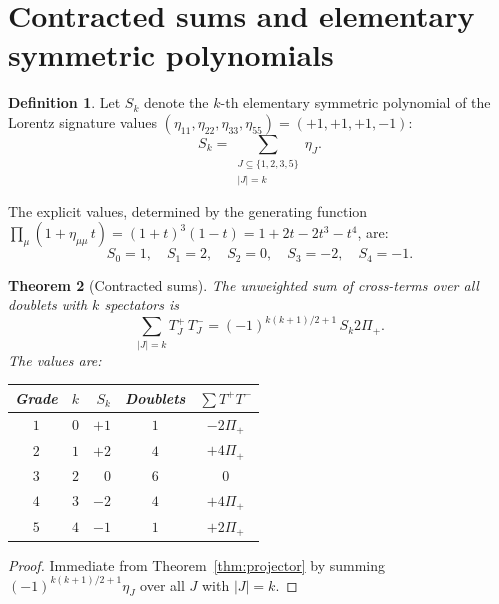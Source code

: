 \documentclass{birkjour}
\newtheorem{thm}{Theorem}[section]
\theoremstyle{definition}
\newtheorem{defn}[thm]{Definition}
\theoremstyle{remark}
\numberwithin{equation}{section}
\begin{document}
\section{Contracted sums and elementary symmetric
polynomials}\label{sec:sums}

\begin{defn}\label{def:Sk}
Let $S_k$ denote the $k$-th elementary symmetric polynomial
of the Lorentz signature values
$(\eta_{11},\eta_{22},\eta_{33},\eta_{55})=(+1,+1,+1,-1)$:
\begin{equation}
S_k=\sum_{\substack{J\subseteq\{1,2,3,5\}\\|J|=k}}\eta_J.
\end{equation}
\end{defn}

The explicit values, determined by the generating function
$\prod_\mu(1+\eta_{\mu\mu}\,t)=(1+t)^3(1-t)=1+2t-2t^3-t^4$,
are:
\begin{equation}\label{eq:Sk}
S_0=1,\quad S_1=2,\quad S_2=0,\quad S_3=-2,\quad S_4=-1.
\end{equation}

\begin{thm}[Contracted sums]\label{thm:sums}
The unweighted sum of cross-terms over all doublets with
$k$ spectators is
\begin{equation}\label{eq:sum-formula}
\sum_{|J|=k}T^+_J\,T^-_J
=(-1)^{k(k+1)/2+1}\,S_k 2\Pi_+.
\end{equation}
The values are:
\begin{center}
\begin{tabular}{ccrcc}
\toprule
\textbf{Grade} & $k$ & $S_k$
& \textbf{Doublets}
& $\sum T^+T^-$\\
\midrule
$1$ & $0$ & $+1$ & $1$ & $-2\Pi_+$\\
$2$ & $1$ & $+2$ & $4$ & $+4\Pi_+$\\
$3$ & $2$ & $0$ & $6$ & $0$\\
$4$ & $3$ & $-2$ & $4$ & $+4\Pi_+$\\
$5$ & $4$ & $-1$ & $1$ & $+2\Pi_+$\\
\bottomrule
\end{tabular}
\end{center}
\end{thm}

\begin{proof}
Immediate from Theorem~\ref{thm:projector} by summing
$(-1)^{k(k+1)/2+1}\eta_J$ over all $J$ with $|J|=k$.
\end{proof}
\end{document}
